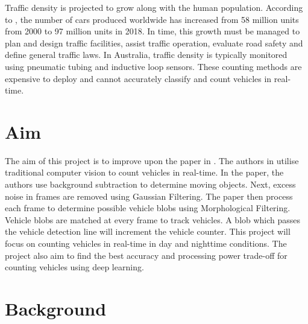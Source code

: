 \documentclass[12pt,a4paper,fleqn]{report}
\begin{document}
Traffic density is projected to grow along with the human population.
According to \cite{placek:2022}, the number of cars produced worldwide has increased from 58 million
units from 2000 to 97 million units in 2018.
In time, this growth must be managed to plan and design traffic facilities, assist traffic
operation, evaluate road safety and define general traffic laws.
In Australia, traffic density is typically monitored using pneumatic tubing and inductive loop
sensors.
These counting methods are expensive to deploy and cannot accurately classify and count vehicles in
real-time.


\section{Aim}
The aim of this project is to improve upon the paper in \cite{rcvavc:2019}.
The authors in \cite{rcvavc:2019} utilise traditional computer vision to count vehicles in real-time.
In the paper, the authors use background subtraction to determine moving objects.
Next, excess noise in frames are removed using Gaussian Filtering.
The paper then process each frame to determine possible vehicle blobs using Morphological
Filtering.
Vehicle blobs are matched at every frame to track vehicles.
A blob which passes the vehicle detection line will increment the vehicle counter.
This project will focus on counting vehicles in real-time in day and nighttime
conditions.
The project also aim to find the best accuracy and processing power trade-off for counting
vehicles using deep learning.


\section{Background}
\end{document}
